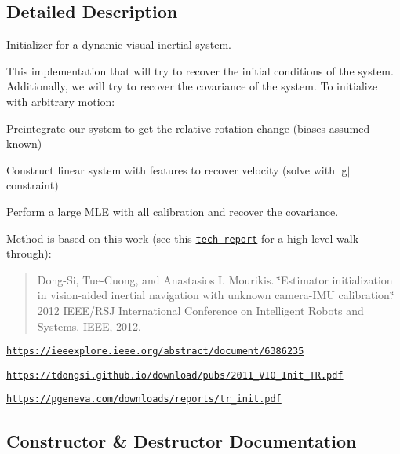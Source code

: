 \subsection{Detailed Description}
Initializer for a dynamic visual-\/inertial system. 

This implementation that will try to recover the initial conditions of the system. Additionally, we will try to recover the covariance of the system. To initialize with arbitrary motion\+:
\begin{DoxyEnumerate}
\item Preintegrate our system to get the relative rotation change (biases assumed known)
\item Construct linear system with features to recover velocity (solve with $\vert$g$\vert$ constraint)
\item Perform a large M\+LE with all calibration and recover the covariance.
\end{DoxyEnumerate}

Method is based on this work (see this \href{https://pgeneva.com/downloads/reports/tr_init.pdf}{\tt tech report} for a high level walk through)\+:

\begin{quote}
Dong-\/\+Si, Tue-\/\+Cuong, and Anastasios I. Mourikis. \char`\"{}\+Estimator initialization in vision-\/aided inertial navigation with unknown camera-\/\+I\+M\+U calibration.\char`\"{} 2012 I\+E\+E\+E/\+R\+SJ International Conference on Intelligent Robots and Systems. I\+E\+EE, 2012. \end{quote}



\begin{DoxyItemize}
\item \href{https://ieeexplore.ieee.org/abstract/document/6386235}{\tt https\+://ieeexplore.\+ieee.\+org/abstract/document/6386235}
\item \href{https://tdongsi.github.io/download/pubs/2011_VIO_Init_TR.pdf}{\tt https\+://tdongsi.\+github.\+io/download/pubs/2011\+\_\+\+V\+I\+O\+\_\+\+Init\+\_\+\+T\+R.\+pdf}
\item \href{https://pgeneva.com/downloads/reports/tr_init.pdf}{\tt https\+://pgeneva.\+com/downloads/reports/tr\+\_\+init.\+pdf} 
\end{DoxyItemize}

\subsection{Constructor \& Destructor Documentation}
\mbox{\label{classov__init_1_1DynamicInitializer_a11e592324aedffe4a5b984cf9651a6ab}} 
